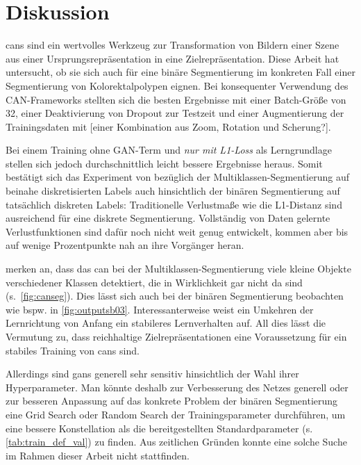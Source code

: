 \chapter{Diskussion}

\glspl{can} sind ein wertvolles Werkzeug zur Transformation von Bildern einer Szene aus einer Ursprungsrepräsentation in eine Zielrepräsentation.
Diese Arbeit hat untersucht, ob sie sich auch für eine binäre Segmentierung im konkreten Fall einer Segmentierung von Kolorektalpolypen eignen.
Bei konsequenter Verwendung des CAN-Frameworks stellten sich die besten Ergebnisse mit einer Batch-Größe von 32, einer Deaktivierung von Dropout zur Testzeit und einer Augmentierung der Trainingsdaten mit [einer Kombination aus Zoom, Rotation und Scherung?]. %

Bei einem Training ohne GAN-Term und \emph{nur mit L1-Loss} als Lerngrundlage stellen sich jedoch durchschnittlich leicht bessere Ergebnisse heraus.
Somit bestätigt sich das Experiment von \citeauthor{Isola.2017} bezüglich der Multiklassen-Segmentierung auf beinahe diskretisierten Labels auch hinsichtlich der binären Segmentierung auf tatsächlich diskreten Labels:
Traditionelle Verlustmaße wie die L1-Distanz sind ausreichend für eine diskrete Segmentierung.
Vollständig von Daten gelernte Verlustfunktionen sind dafür noch nicht weit genug entwickelt, kommen aber bis auf wenige Prozentpunkte nah an ihre Vorgänger heran.

\citeauthor{Isola.2017} merken an, dass das \gls{can} bei der Multiklassen-Segmentierung viele kleine Objekte verschiedener Klassen detektiert, die in Wirklichkeit gar nicht da sind (s.~\autoref{fig:canseg}).
Dies lässt sich auch bei der binären Segmentierung beobachten wie bspw. in \autoref{fig:outputsb03}.
Interessanterweise weist ein Umkehren der Lernrichtung von Anfang ein stabileres Lernverhalten auf.
All dies lässt die Vermutung zu, dass reichhaltige Zielrepräsentationen eine Voraussetzung für ein stabiles Training von \glspl{can} sind.

Allerdings sind \glspl{gan} generell sehr sensitiv hinsichtlich der Wahl ihrer Hyperparameter.
Man könnte deshalb zur Verbesserung des Netzes generell oder zur besseren Anpassung auf das konkrete Problem der binären Segmentierung eine Grid Search oder Random Search der Trainingsparameter durchführen, um eine bessere Konstellation als die bereitgestellten Standardparameter (s. \autoref{tab:train_def_val}) zu finden.
Aus zeitlichen Gründen konnte eine solche Suche im Rahmen dieser Arbeit nicht stattfinden.



